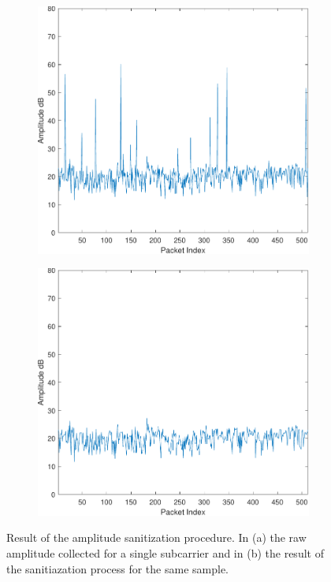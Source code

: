 \documentclass[binding=0.6cm,noexaminfo]{sapthesis}
\begin{document}
\begin{figure}[h!]
\centering
\begin{subfigure}{.49\textwidth}
	\centering
	\includegraphics[width=.9\linewidth]{Amplitude TX1-RX1 vs Packet Index subcarrier_1}
	\caption{}
\end{subfigure}
\begin{subfigure}{.49\textwidth}
	\centering
	\includegraphics[width=.9\linewidth]{Amplitude TX1-RX1 vs Packet Index (Sanatized) subcarrier_1}
	\caption{}
\end{subfigure}
\caption{Result of the amplitude sanitization procedure. In (a) the raw amplitude collected for a single subcarrier and in (b) the result of the sanitiazation process for the same sample.}
\label{fig:amp-san}
\end{figure}
\end{document}
